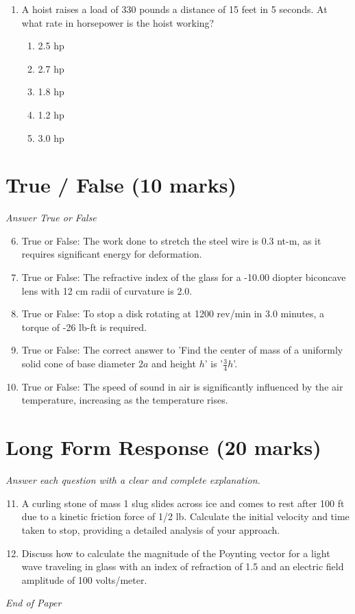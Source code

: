 \documentclass[12pt]{article}
\begin{document}
\begin{enumerate}[label=\arabic*.]
\begin{enumerate}[label=(\alph*)]
    \item 4 mm
    \item .833 mm
    \item 1 mm
    \item 1.5 mm
    \item 0.5 mm
\end{enumerate}
\item A hoist raises a load of 330 pounds a distance of 15 feet in 5 seconds. At what rate in horsepower is the hoist working?
\begin{enumerate}[label=(\alph*)]
    \item 2.5 hp
    \item 2.7 hp
    \item 1.8 hp
    \item 1.2 hp
    \item 3.0 hp
\end{enumerate}
\end{enumerate}

\section*{True / False (10 marks)}
\textit{Answer True or False}
\begin{enumerate}[label=\arabic*.]
\setcounter{enumi}{5}
\item True or False: The work done to stretch the steel wire is 0.3 nt-m, as it requires significant energy for deformation.
\item True or False: The refractive index of the glass for a -10.00 diopter biconcave lens with 12 cm radii of curvature is 2.0.
\item True or False: To stop a disk rotating at 1200 rev/min in 3.0 minutes, a torque of -26 lb-ft is required.
\item True or False: The correct answer to 'Find the center of mass of a uniformly solid cone of base diameter $2 a$ and height $h$' is '$\frac{3}{4}$$h$'.
\item True or False: The speed of sound in air is significantly influenced by the air temperature, increasing as the temperature rises.
\end{enumerate}

\section*{Long Form Response (20 marks)}
\textit{Answer each question with a clear and complete explanation.}
\begin{enumerate}[label=\arabic*.]
\setcounter{enumi}{10}
\item A curling stone of mass 1 slug slides across ice and comes to rest after 100 ft due to a kinetic friction force of 1/2 lb. Calculate the initial velocity and time taken to stop, providing a detailed analysis of your approach.
\item Discuss how to calculate the magnitude of the Poynting vector for a light wave traveling in glass with an index of refraction of 1.5 and an electric field amplitude of 100 volts/meter.
\end{enumerate}

\vfill
\noindent\textit{End of Paper}
\end{document}
